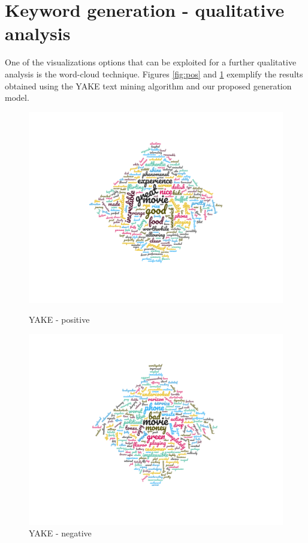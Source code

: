\section{Keyword generation - qualitative analysis}
One of the visualizations options that can be exploited for a further qualitative analysis is the word-cloud technique. Figures \ref{fig:pos} and \ref{fig:neg} exemplify the results obtained using the YAKE text mining algorithm and our proposed generation model.
\begin{figure}[H]
  \centering
  \minipage{\textwidth}
  \includegraphics[width=\linewidth]{Images/yake_pos.png}
  \caption{YAKE - positive}
  \label{fig:pos}
\endminipage\hfill
  \minipage{\textwidth}
  \includegraphics[width=\linewidth]{Images/yake_neg.png}
  \caption{YAKE - negative}
  \label{fig:neg}
\endminipage\hfill
\end{figure}%
